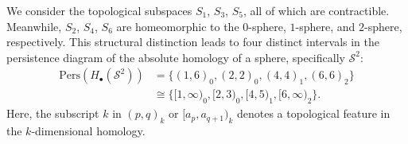 \begin{example}{\cite[\S 2.3, Example]{de2011dualities}}
    We consider the topological subspaces $S_{1}$,
    $S_{3}$, $S_{5}$, all of which are contractible. Meanwhile,
    $S_{2}$, $S_{4}$, $S_{6}$ are homeomorphic to the $0$-sphere, $1$-sphere, and $2$-sphere,
    respectively. This structural distinction leads to four distinct intervals in
    the persistence diagram of the absolute homology of a sphere, specifically $\mathcal{S}^{2}$:
    \begin{align}
        \mathrm{Pers}(H_{\bullet}(\mathcal{S}^{2})) & = \{(1,6)_{0}, (2,2)_{0}, (4,4)_{1}, (6,6)_{2} \}             \nonumber\\
                                                    & \cong \{[1,\infty)_{0}, [2,3)_{0}, [4,5)_{1}, [6, \infty)_{2} \}.
    \end{align}
    Here, the subscript $k$ in $(p,q)_{k}$ or $[a_{p}, a_{q+1})_{k}$ denotes a topological
    feature in the $k$-dimensional homology.
\end{example}

